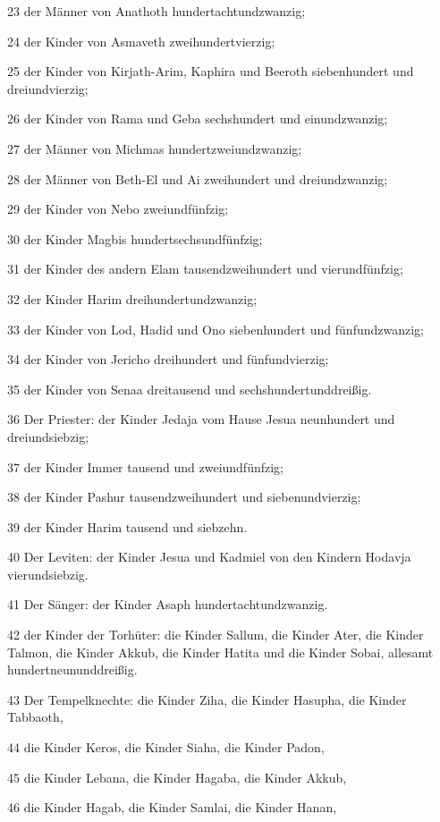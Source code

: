 \par 23 der Männer von Anathoth hundertachtundzwanzig;
\par 24 der Kinder von Asmaveth zweihundertvierzig;
\par 25 der Kinder von Kirjath-Arim, Kaphira und Beeroth siebenhundert und dreiundvierzig;
\par 26 der Kinder von Rama und Geba sechshundert und einundzwanzig;
\par 27 der Männer von Michmas hundertzweiundzwanzig;
\par 28 der Männer von Beth-El und Ai zweihundert und dreiundzwanzig;
\par 29 der Kinder von Nebo zweiundfünfzig;
\par 30 der Kinder Magbis hundertsechsundfünfzig;
\par 31 der Kinder des andern Elam tausendzweihundert und vierundfünfzig;
\par 32 der Kinder Harim dreihundertundzwanzig;
\par 33 der Kinder von Lod, Hadid und Ono siebenhundert und fünfundzwanzig;
\par 34 der Kinder von Jericho dreihundert und fünfundvierzig;
\par 35 der Kinder von Senaa dreitausend und sechshundertunddreißig.
\par 36 Der Priester: der Kinder Jedaja vom Hause Jesua neunhundert und dreiundsiebzig;
\par 37 der Kinder Immer tausend und zweiundfünfzig;
\par 38 der Kinder Pashur tausendzweihundert und siebenundvierzig;
\par 39 der Kinder Harim tausend und siebzehn.
\par 40 Der Leviten: der Kinder Jesua und Kadmiel von den Kindern Hodavja vierundsiebzig.
\par 41 Der Sänger: der Kinder Asaph hundertachtundzwanzig.
\par 42 der Kinder der Torhüter: die Kinder Sallum, die Kinder Ater, die Kinder Talmon, die Kinder Akkub, die Kinder Hatita und die Kinder Sobai, allesamt hundertneununddreißig.
\par 43 Der Tempelknechte: die Kinder Ziha, die Kinder Hasupha, die Kinder Tabbaoth,
\par 44 die Kinder Keros, die Kinder Siaha, die Kinder Padon,
\par 45 die Kinder Lebana, die Kinder Hagaba, die Kinder Akkub,
\par 46 die Kinder Hagab, die Kinder Samlai, die Kinder Hanan,
